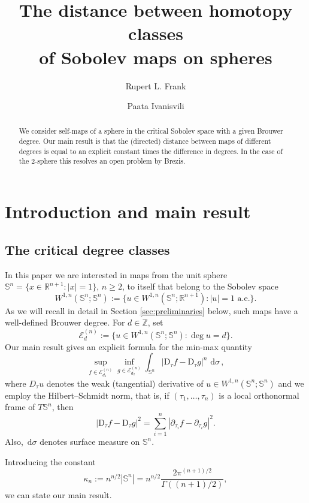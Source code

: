 \documentclass[11pt,reqno]{amsart}
\title[Homotopy classes of Sobolev maps on spheres]{The distance between homotopy classes\\ of Sobolev maps on spheres}
\author{Rupert L. Frank}
\author[P.~Ivanisvili]{Paata Ivanisvili}
\numberwithin{equation}{section}
\newcommand{\Sph}{\mathbb S}
\newcommand{\R}{\mathbb R}
\newcommand{\Z}{\mathbb Z}
\newcommand{\E}{\mathcal E}
\newcommand{\D}{\mathrm D}
\newcommand{\dd}{\,\mathrm d}
\begin{document}
\begin{abstract}
    We consider self-maps of a sphere in the critical Sobolev space with a given Brouwer degree. Our main result is that the (directed) distance between maps of different degrees is equal to an explicit constant times the difference in degrees. In the case of the 2-sphere this resolves an open problem by Brezis.
\end{abstract}

\maketitle

\section{Introduction and main result}\label{sec:introduction}

\subsection{The critical degree classes}
In this paper we are interested in maps from the unit sphere $\Sph^n=\{x\in\R^{n+1}:|x|=1\}$, $n\geq 2$, to itself that belong to the Sobolev space
\begin{equation}\label{eq:critical-space}
  W^{1,n}(\Sph^n;\Sph^n)
  :=\{u\in W^{1,n}(\Sph^n;\R^{n+1}):|u|=1\text{ a.e.}\}.
\end{equation}
As we will recall in detail in Section \ref{sec:preliminaries} below, such maps have a well-defined Brouwer degree. For $d\in\Z$, set
\begin{equation}\label{eq:degree-class}
  \E_d^{(n)}
  :=\{u\in W^{1,n}(\Sph^n;\Sph^n):\deg u=d\}.
\end{equation}
Our main result gives an explicit formula for the min-max quantity
$$
\sup_{f\in\E_{d_1}^{(n)}}
    \inf_{g\in\E_{d_2}^{(n)}} \int_{\Sph^n}|\D_\tau f-\D_\tau g|^n\,\dd\sigma \,,
$$
where $D_\tau u$ denotes the weak (tangential) derivative of $u\in W^{1,n}(\Sph^n;\Sph^n)$ and we employ the Hilbert--Schmidt norm, that is, if $(\tau_1,\dots,\tau_n)$ is a local orthonormal frame of $T\Sph^n$, then
\[
  |\D_\tau f - \D_\tau g|^2=\sum_{i=1}^n|\partial_{\tau_i}f - \partial_{\tau_i} g|^2.
\]
Also, $\dd\sigma$ denotes surface measure on $\Sph^n$.

Introducing the constant
$$
\kappa_n:=n^{n/2}|\Sph^n|= n^{n/2} \frac{2\pi^{(n+1)/2}}{\Gamma((n+1)/2)},
$$
we can state our main result.
\end{document}
